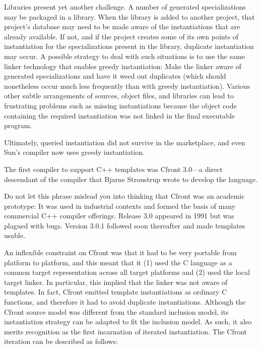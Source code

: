 Libraries present yet another challenge. A number of generated specializations may be packaged in a library. When the library is added to another project, that project’s database may need to be made aware of the instantiations that are already available. If not, and if the project creates some of its own points of instantiation for the specializations present in the library, duplicate instantiation may occur. A possible strategy to deal with such situations is to use the same linker technology that enables greedy instantiation: Make the linker aware of generated specializations and have it weed out duplicates (which should nonetheless occur much less frequently than with greedy instantiation). Various other subtle arrangements of sources, object files, and libraries can lead to frustrating problems such as missing instantiations because the object code containing the required instantiation was not linked in the final executable program.

Ultimately, queried instantiation did not survive in the marketplace, and even Sun’s compiler now uses greedy instantiation.


The first compiler to support C++ templates was Cfront 3.0—a direct descendant of the compiler that Bjarne Stroustrup wrote to develop the language.

\begin{tcolorbox}[colback=webgreen!5!white,colframe=webgreen!75!black]
\hspace*{0.75cm}Do not let this phrase mislead you into thinking that Cfront was an academic prototype: It was used in industrial contexts and formed the basis of many commercial C++ compiler offerings. Release 3.0 appeared in 1991 but was plagued with bugs. Version 3.0.1 followed soon thereafter and made templates usable.
\end{tcolorbox}

An inflexible constraint on Cfront was that it had to be very portable from platform to platform, and this meant that it (1) used the C language as a common target representation across all target platforms and (2) used the local target linker. In particular, this implied that the linker was not aware of templates. In fact, Cfront emitted template instantiations as ordinary C functions, and therefore it had to avoid duplicate instantiations. Although the Cfront source model was different from the standard inclusion model, its instantiation strategy can be adapted to fit the inclusion model. As such, it also merits recognition as the first incarnation of iterated instantiation. The Cfront iteration can be described as follows:


